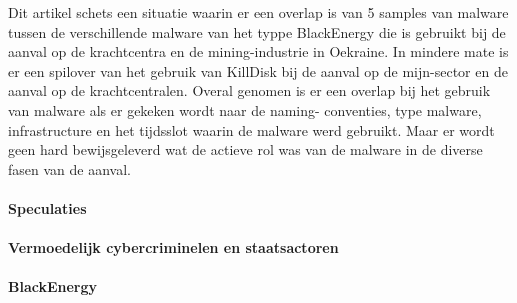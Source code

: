 Dit artikel schets een situatie waarin er een overlap is van 5 samples van malware tussen de
verschillende malware van het typpe BlackEnergy die is gebruikt bij de aanval op de krachtcentra en
de mining-industrie in Oekraine.
In mindere mate is er een spilover van het gebruik van KillDisk bij de aanval op de mijn-sector en de
aanval op de krachtcentralen.
Overal genomen is er een overlap bij het gebruik van malware als er gekeken wordt naar de naming-
conventies, type malware, infrastructure en het tijdsslot waarin de malware werd gebruikt. Maar er
wordt geen hard bewijsgeleverd wat de actieve rol was van de malware in de diverse fasen van de
aanval.

	
	
	\paragraph{Speculaties}
	
	\paragraph{Vermoedelijk cybercriminelen en staatsactoren}
	
	
	
	\paragraph{BlackEnergy}
	

